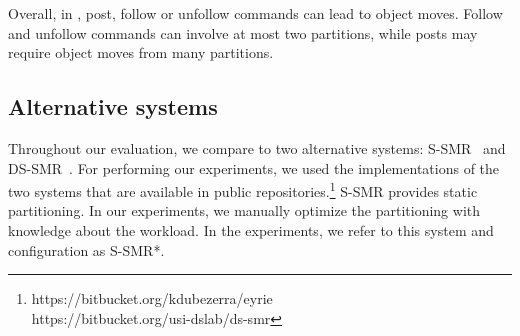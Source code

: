 Overall, in \appname, post, follow or unfollow commands can lead to
object moves.  Follow and unfollow commands can involve at most two
partitions, while posts may require object moves from many partitions.



\subsection{Alternative systems}

Throughout our evaluation, we compare \dynastar{} to two alternative
systems: S-SMR~\cite{bezerra2014ssmr} and DS-SMR~\cite{hoang2016}. For performing our experiments, we used the
implementations of the two systems that are available in public
repositories.\footnote{https://bitbucket.org/kdubezerra/eyrie\\ \mbox{\hspace{5mm}https://bitbucket.org/usi-dslab/ds-smr}} 
S-SMR provides static partitioning. In our experiments, we manually optimize the partitioning with knowledge about the workload.
In the experiments, we refer to this system and configuration as S-SMR*.

